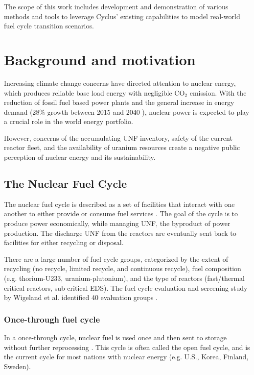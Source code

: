 The scope of this work includes development and demonstration of
various methods and tools to leverage Cyclus' existing
capabilities to model real-world fuel cycle transition scenarios.

\section{Background and motivation}
Increasing climate change concerns have directed attention
to nuclear energy, which produces reliable base load energy
with negligible CO$_2$ emission. With the reduction of fossil
fuel based power plants and the general increase in energy demand
(28\% growth between 2015 and 2040 \cite{conti_international_2016}),
nuclear power is expected to play a crucial role in the world energy portfolio.

However, concerns of the accumulating \gls{UNF} inventory,
safety of the current reactor fleet, and the availability of
uranium resources create a negative public perception of
nuclear energy and its sustainability.

\subsection{The Nuclear Fuel Cycle}
The nuclear fuel cycle is described as a set of facilities
that interact with one another to either provide or consume
fuel services \cite{gidden_agent-based_2015}. The goal of
the cycle is to produce power economically, while managing
\gls{UNF}, the byproduct of power production. The discharge
\gls{UNF} from the reactors are eventually sent back to facilities for
either recycling or disposal. 

There are a large number of fuel cycle groups, categorized by the extent of recycling
(no recycle, limited recycle, and continuous recycle), fuel composition
(e.g. thorium-U233, uranium-plutonium), and the type of reactors (fast/thermal critical
reactors, sub-critical \gls{EDS}). The fuel cycle evaluation and screening study by
Wigeland et al. identified 40 evaluation groups \cite{wigeland_nuclear_2014}.

\subsubsection{Once-through fuel cycle}

In a once-through cycle, nuclear fuel is used once and then sent to 
storage without further reprocessing \cite{tsoulfanidis_nuclear_2013}.
This cycle is often called the open fuel cycle, and is the current cycle for
most nations with nuclear energy (e.g. U.S., Korea, Finland, Sweden).

